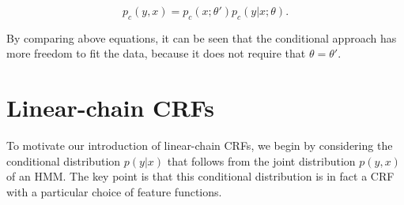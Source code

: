 \documentclass{article}
\begin{document}
\[p_c(y, x) = p_c(x; \theta')p_c(y|x; \theta).\]

By comparing above equations, it can be seen that the conditional
approach has more freedom to fit the data, because it does not require that $\theta = \theta'$. 



\section{Linear-chain CRFs}
To motivate our introduction of linear-chain CRFs, we begin by considering the conditional distribution $p(y|x)$ that follows from the joint distribution $p(y,x)$ of an HMM. The key point is that this conditional distribution is in fact a CRF with a particular choice of feature functions.
\end{document}
